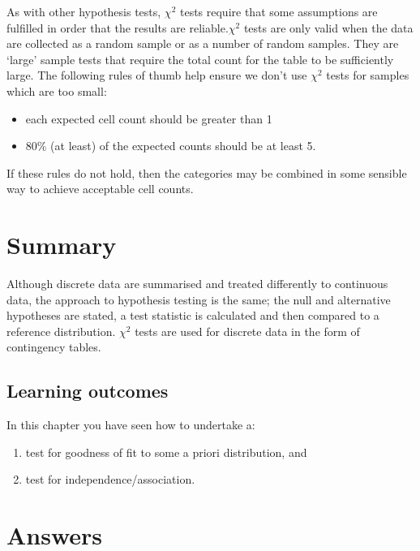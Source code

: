 \documentclass[
  oneside]{krantz}
\providecommand{\tightlist}{%
  \setlength{\itemsep}{0pt}\setlength{\parskip}{0pt}}
\begin{document}
As with other hypothesis tests, \(\chi^2\) tests require that some assumptions are fulfilled in order that the results are reliable.\(\chi^2\) tests are only valid when the data are collected as a random sample or as a number of random samples. They are `large' sample tests that require the total count for the table to be sufficiently large. The following rules of thumb help ensure we don't use \(\chi^2\) tests for samples which are too small:

\begin{itemize}
\tightlist
\item
  each expected cell count should be greater than 1
\item
  80\% (at least) of the expected counts should be at least 5.
\end{itemize}

If these rules do not hold, then the categories may be combined in some sensible way to achieve acceptable cell counts.

\hypertarget{summary}{%
\section{Summary}\label{summary}}

Although discrete data are summarised and treated differently to continuous data, the approach to hypothesis testing is the same; the null and alternative hypotheses are stated, a test statistic is calculated and then compared to a reference distribution. \(\chi^2\) tests are used for discrete data in the form of contingency tables.

\hypertarget{learning-outcomes-8}{%
\subsection{Learning outcomes}\label{learning-outcomes-8}}

In this chapter you have seen how to undertake a:

\begin{enumerate}
\def\labelenumi{\arabic{enumi}.}
\item
  test for goodness of fit to some a priori distribution, and
\item
  test for independence/association.
\end{enumerate}

\hypertarget{answers}{%
\section{Answers}\label{answers}}
\end{document}
